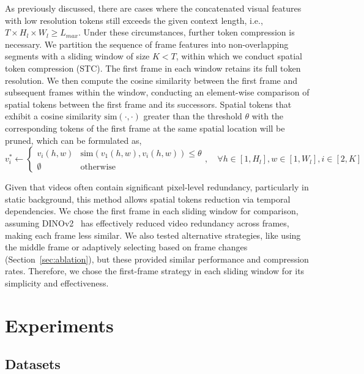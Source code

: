 As previously discussed, there are cases where the concatenated visual features with low resolution tokens still exceeds the given context length, i.e., $T\times H_l\times W_l \geq L_{max}$. Under these circumstances, further token compression is necessary. We partition the sequence of frame features into non-overlapping segments with a sliding window of size $K<T$, within which we conduct spatial token compression (STC). The first frame in each window retains its full token resolution. We then compute the cosine similarity between the first frame and subsequent frames within the window, conducting an element-wise comparison of spatial tokens between the first frame and its successors. Spatial tokens that exhibit a cosine similarity $\text{sim}(\cdot,\cdot)$ greater than the threshold $\theta$ with the corresponding tokens of the first frame at the same spatial location will be pruned, which can be formulated as, 
\begin{equation}\label{eq:prune} v_i^* \leftarrow \begin{cases} v_i(h, w) & \text{sim}(v_1(h, w), v_i(h, w)) \leq \theta \\ \emptyset & \text{otherwise} \end{cases}, \quad \forall h \in [1, H_l], w \in [1, W_l], i \in [2, K] \end{equation}

Given that videos often contain significant pixel-level redundancy, particularly in static background, this method allows spatial tokens reduction via temporal dependencies.
We chose the first frame in each sliding window for comparison, assuming DINOv2~\citep{oquab2023dinov2} has effectively reduced video redundancy across frames, making each frame less similar. We also tested alternative strategies, like using the middle frame or adaptively selecting based on frame changes (Section~\ref{sec:ablation}), but these provided similar performance and compression rates. Therefore, we chose the first-frame strategy in each sliding window for its simplicity and effectiveness.
\section{Experiments}

\subsection{Datasets}

